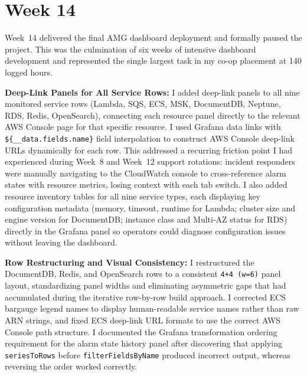
\FloatBarrier

\section{Week 14}
\label{sec:week14}

Week~14 delivered the final AMG dashboard deployment and formally paused the project. This was the culmination of six weeks of intensive dashboard development and represented the single largest task in my co-op placement at 140 logged hours.

\textbf{Deep-Link Panels for All Service Rows:} 
I added deep-link panels to all nine monitored service rows (Lambda, SQS, ECS, MSK, DocumentDB, Neptune, RDS, Redis, OpenSearch), connecting each resource panel directly to the relevant AWS Console page for that specific resource. I used Grafana data links with \texttt{\$\{\_\_data.fields.name\}} field interpolation to construct AWS Console deep-link URLs dynamically for each row. This addressed a recurring friction point I had experienced during Week~8 and Week~12 support rotations: incident responders were manually navigating to the CloudWatch console to cross-reference alarm states with resource metrics, losing context with each tab switch. I also added resource inventory tables for all nine service types, each displaying key configuration metadata (memory, timeout, runtime for Lambda; cluster size and engine version for DocumentDB; instance class and Multi-AZ status for RDS) directly in the Grafana panel so operators could diagnose configuration issues without leaving the dashboard.

\textbf{Row Restructuring and Visual Consistency:} 
I restructured the DocumentDB, Redis, and OpenSearch rows to a consistent \texttt{4+4~(w=6)} panel layout, standardizing panel widths and eliminating asymmetric gaps that had accumulated during the iterative row-by-row build approach. I corrected ECS bargauge legend names to display human-readable service names rather than raw ARN strings, and fixed ECS deep-link URL formats to use the correct AWS Console path structure. I documented the Grafana transformation ordering requirement for the alarm state history panel after discovering that applying \texttt{seriesToRows} before \texttt{filterFieldsByName} produced incorrect output, whereas reversing the order worked correctly.

